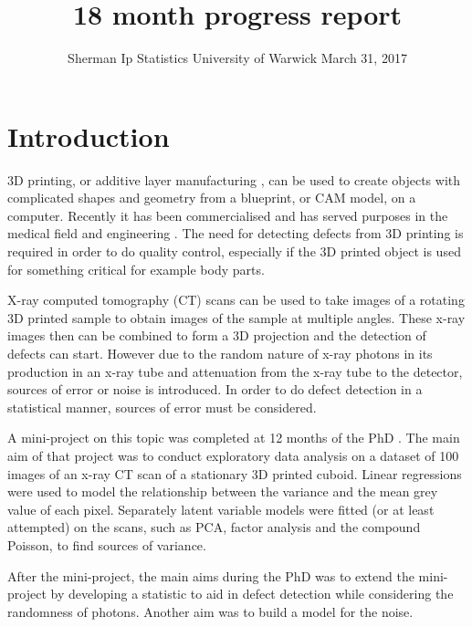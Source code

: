\documentclass[a4paper]{proc}
\title{18 month progress report}
\author{Sherman Ip \quad Statistics \quad University of Warwick \quad March 31, 2017}
\begin{document}
\maketitle

\begin{abstract}

\end{abstract}

\section{Introduction}
3D printing, or additive layer manufacturing \cite{kodama1981automatic} \cite{wong2012review}, can be used to create objects with complicated shapes and geometry from a blueprint, or CAM model, on a computer.  Recently it has been commercialised and has served purposes in the medical field \cite{kang20163d} and engineering \cite{wong2012review}. The need for detecting defects from 3D printing is required in order to do quality control, especially if the 3D printed object is used for something critical for example body parts. 

X-ray computed tomography (CT) \cite{hounsfield1980computed} \cite{michael2001x} \cite{cantatore2011introduction} scans can be used to take images of a rotating 3D printed sample to obtain images of the sample at multiple angles. These x-ray images then can be combined to form a 3D projection and the detection of defects can start. However due to the random nature of x-ray photons in its production in an x-ray tube and attenuation from the x-ray tube to the detector, sources of error or noise is introduced. In order to do defect detection in a statistical manner, sources of error must be considered.

A mini-project on this topic was completed at 12 months of the PhD \cite{ip2016inside}. The main aim of that project was to conduct exploratory data analysis on a dataset of 100 images of an x-ray CT scan of a stationary 3D printed cuboid. Linear regressions were used to model the relationship between the variance and the mean grey value of each pixel. Separately latent variable models were fitted (or at least attempted) on the scans, such as PCA, factor analysis and the compound Poisson, to find sources of variance.

After the mini-project, the main aims during the PhD was to extend the mini-project by developing a statistic to aid in defect detection while considering the randomness of photons. Another aim was to build a model for the noise.
\end{document}
